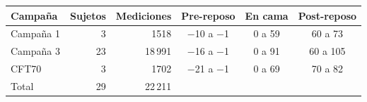 \begin{tabular}{lrrccc}\toprule
 Campaña & Sujetos & Mediciones & Pre-reposo & En cama & Post-reposo \\
\midrule
Campaña 1 & 3 & 1518 & −10 a −1 & 0 a 59 & 60 a 73 \\
Campaña 3 & 23 & 18\,991 & −16 a −1 & 0 a 91 & 60 a 105 \\
CFT70 & 3 & 1702 & −21 a −1 & 0 a 69 & 70 a 82 \\
\midrule Total & 29 & 22\,211 & & & \\
\bottomrule\end{tabular}
